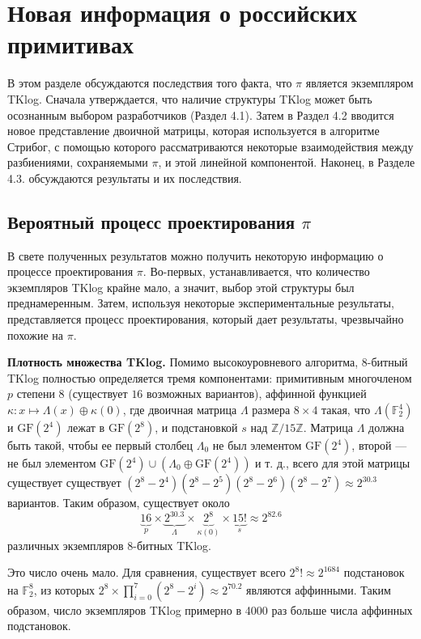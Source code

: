 \section{Новая информация о российских примитивах}

В этом разделе обсуждаются последствия того факта, что \(\pi\) является экземпляром TKlog. Сначала утверждается, что наличие структуры TKlog может быть осознанным выбором разработчиков (Раздел 4.1). Затем в Раздел 4.2 вводится новое представление двоичной матрицы, которая используется в алгоритме Стрибог, с помощью которого рассматриваются некоторые взаимодействия между разбиениями, сохраняемыми \(\pi\), и этой линейной компонентой. Наконец, в Разделе 4.3. обсуждаются результаты и их последствия.

\subsection{Вероятный процесс проектирования \(\pi\)}
В свете полученных результатов можно получить некоторую информацию о процессе проектирования \(\pi\). Во-первых, устанавливается, что количество экземпляров TKlog крайне мало, а значит, выбор этой структуры был преднамеренным. Затем, используя некоторые экспериментальные результаты, представляется процесс проектирования, который дает результаты, чрезвычайно похожие на \(\pi\).

\textbf{Плотность множества TKlog.} Помимо высокоуровневого алгоритма, 8-битный TKlog полностью определяется тремя компонентами: примитивным многочленом \(p\) степени $8$ (существует $16$ возможных вариантов), аффинной функцией \(\kappa : x \mapsto \Lambda(x) \oplus \kappa(0)\), где двоичная матрица \(\Lambda\) размера \(8 \times 4\) такая, что \(\Lambda(\mathbb{F}_{2}^{4})\) и \(\text{GF}(2^4)\) лежат в \(\text{GF}(2^8)\), и подстановкой \(s\) над \(\mathbb{Z}/15\mathbb{Z}\). Матрица \(\Lambda\) должна быть такой, чтобы ее первый столбец \(\Lambda_0\) не был элементом \(\text{GF}(2^4)\), второй — не был элементом \(\text{GF}(2^4) \cup (\Lambda_0 \oplus \text{GF}(2^4))\) и т. д., всего для этой матрицы существует существует \((2^8 - 2^4)(2^8 - 2^5)(2^8 - 2^6)(2^8 - 2^7) \approx 2^{30.3}\) вариантов. Таким образом, существует около
\[
  \underbrace{16}_{p} \times \underbrace{2^{30.3}}_{\Lambda} \times \underbrace{2^8}_{\kappa(0)} \times \underbrace{15!}_{s} \approx 2^{82.6}
\]
различных экземпляров 8-битных TKlog.

Это число очень мало. Для сравнения, существует всего \(2^8! \approx 2^{1684}\) подстановок на \(\mathbb{F}_2^8\), из которых \(2^8 \times \prod_{i=0}^{7}(2^8 - 2^i) \approx 2^{70.2}\) являются аффинными. Таким образом, число экземпляров TKlog примерно в 4000 раз больше числа аффинных подстановок.

